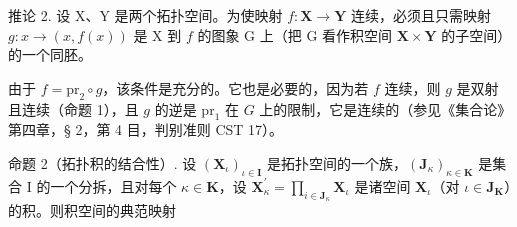 推论 2. 设 X、Y 是两个拓扑空间。为使映射 \(f: \mathbf{X} \to \mathbf{Y}\) 连续，必须且只需映射 \(g: x \to (x, f(x))\) 是 X 到 \(f\) 的图象 G 上（把 G 看作积空间 \(\mathbf{X} \times \mathbf{Y}\) 的子空间）的一个同胚。

由于 \(f = \mathrm{pr}_2 \circ g\)，该条件是充分的。它也是必要的，因为若 \(f\) 连续，则 \(g\) 是双射且连续（命题 1），且 \(g\) 的逆是 \(\mathrm{pr}_1\) 在 \(G\) 上的限制，它是连续的（参见《集合论》第四章，§ 2，第 4 目，判别准则 CST 17）。

命题 2（拓扑积的结合性）. 设 \((\mathbf{X}_{\iota})_{\iota \in \mathbf{I}}\) 是拓扑空间的一个族，\((\mathbf{J}_{\kappa})_{\kappa \in \mathbf{K}}\) 是集合 I 的一个分拆，且对每个 \(\kappa \in \mathbf{K}\)，设 \(\mathbf{X}_{\kappa}^{\prime} = \prod_{i\in \mathbf{J}_{\kappa}}\mathbf{X}_{\iota}\) 是诸空间 \(\mathbf{X}_{\iota}\)（对 \(\iota \in \mathbf{J}_{\mathbf{K}}\)）的积。则积空间的典范映射
